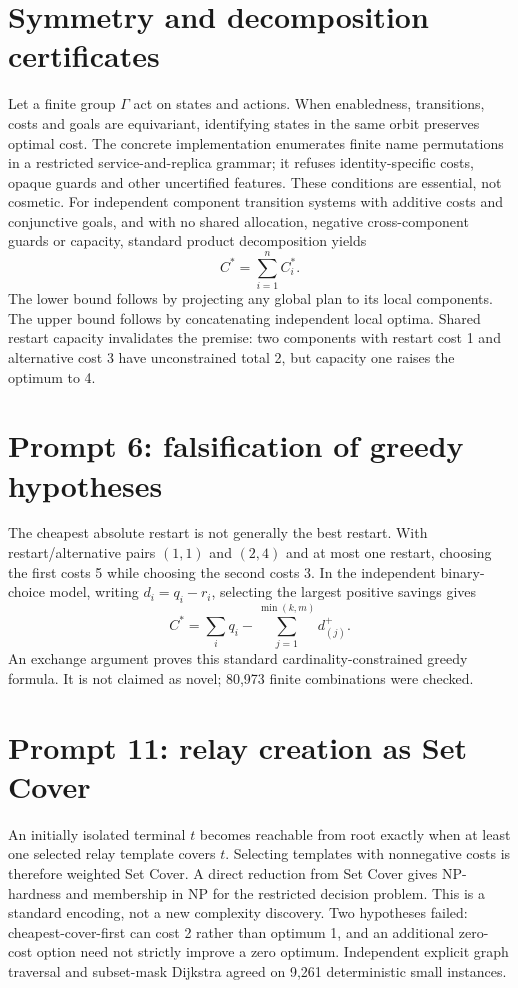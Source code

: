 \documentclass[10pt,a4paper]{article}
\begin{document}
\section{Symmetry and decomposition certificates}
Let a finite group $\Gamma$ act on states and actions. When enabledness, transitions, costs and goals are equivariant, identifying states in the same orbit preserves optimal cost. The concrete implementation enumerates finite name permutations in a restricted service-and-replica grammar; it refuses identity-specific costs, opaque guards and other uncertified features. These conditions are essential, not cosmetic. For independent component transition systems with additive costs and conjunctive goals, and with no shared allocation, negative cross-component guards or capacity, standard product decomposition yields
\[ C^*=\sum_{i=1}^{n}C_i^*. \]
The lower bound follows by projecting any global plan to its local components. The upper bound follows by concatenating independent local optima. Shared restart capacity invalidates the premise: two components with restart cost 1 and alternative cost 3 have unconstrained total 2, but capacity one raises the optimum to 4.
\section{Prompt 6: falsification of greedy hypotheses}
The cheapest absolute restart is not generally the best restart. With restart/alternative pairs $(1,1)$ and $(2,4)$ and at most one restart, choosing the first costs 5 while choosing the second costs 3. In the independent binary-choice model, writing $d_i=q_i-r_i$, selecting the largest positive savings gives
\[ C^*=\sum_i q_i-\sum_{j=1}^{\min(k,m)}d^+_{(j)}. \]
An exchange argument proves this standard cardinality-constrained greedy formula. It is not claimed as novel; 80,973 finite combinations were checked.
\section{Prompt 11: relay creation as Set Cover}
An initially isolated terminal $t$ becomes reachable from root exactly when at least one selected relay template covers $t$. Selecting templates with nonnegative costs is therefore weighted Set Cover. A direct reduction from Set Cover gives NP-hardness and membership in NP for the restricted decision problem. This is a standard encoding, not a new complexity discovery. Two hypotheses failed: cheapest-cover-first can cost 2 rather than optimum 1, and an additional zero-cost option need not strictly improve a zero optimum. Independent explicit graph traversal and subset-mask Dijkstra agreed on 9,261 deterministic small instances.
\end{document}
